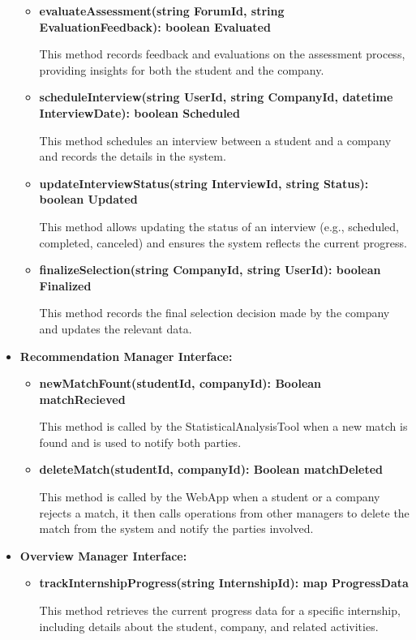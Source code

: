 \begin{itemize}
\begin{itemize}
    \item \textbf{evaluateAssessment(string ForumId, string EvaluationFeedback): boolean Evaluated}

    This method records feedback and evaluations on the assessment process, providing insights for both the student and the company.
    
    \item \textbf{scheduleInterview(string UserId, string CompanyId, datetime InterviewDate): boolean Scheduled}

    This method schedules an interview between a student and a company and records the details in the system.

    \item \textbf{updateInterviewStatus(string InterviewId, string Status): boolean Updated}

    This method allows updating the status of an interview (e.g., scheduled, completed, canceled) and ensures the system reflects the current progress.

    \item \textbf{finalizeSelection(string CompanyId, string UserId): boolean Finalized}

    This method records the final selection decision made by the company and updates the relevant data.
\end{itemize}
\item \textbf{Recommendation Manager Interface:}
\begin{itemize}
    \item \textbf{newMatchFount(studentId, companyId): Boolean matchRecieved}

    This method is called by the StatisticalAnalysisTool when a new match is found and is used to notify both parties.

    \item \textbf{deleteMatch(studentId, companyId): Boolean matchDeleted}

    This method is called by the WebApp when a student or a company rejects a match, it then calls operations from other managers to delete the match from the system and notify the parties involved.
\end{itemize}
\item \textbf{Overview Manager Interface:}
\begin{itemize}
    \item \textbf{trackInternshipProgress(string InternshipId): map ProgressData}

    This method retrieves the current progress data for a specific internship, including details about the student, company, and related activities.


\end{itemize}
\end{itemize}
